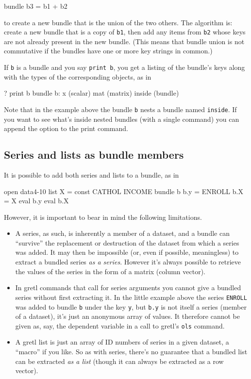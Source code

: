 \begin{code}
bundle b3 = b1 + b2
\end{code}

to create a new bundle that is the union of the two others. The
algorithm is: create a new bundle that is a copy of \texttt{b1}, then
add any items from \texttt{b2} whose keys are not already present in
the new bundle. (This means that bundle union is not commutative if
the bundles have one or more key strings in common.)

If \texttt{b} is a bundle and you say \texttt{print b}, you get a
listing of the bundle's keys along with the types of the corresponding
objects, as in

\begin{code}
? print b
bundle b:
 x (scalar)
 mat (matrix)
 inside (bundle)
\end{code}

Note that in the example above the bundle \texttt{b} nests a bundle
named \texttt{inside}. If you want to see what's inside nested bundles
(with a single command) you can append the  option to the
print command.

\subsection{Series and lists as bundle members}

It is possible to add both series and lists to a bundle, as in
\begin{code}
open data4-10
list X = const CATHOL INCOME
bundle b
b.y = ENROLL
b.X = X
eval b.y
eval b.X
\end{code}

However, it is important to bear in mind the following limitations.
\begin{itemize}
\item A series, as such, is inherently a member of a dataset, and a
  bundle can ``survive'' the replacement or destruction of the dataset
  from which a series was added. It may then be impossible (or, even
  if possible, meaningless) to extract a bundled series \textit{as a
    series}. However it's always possible to retrieve the values of
  the series in the form of a matrix (column vector).
\item In gretl commands that call for series arguments you cannot give
  a bundled series without first extracting it. In the little example
  above the series \texttt{ENROLL} was added to bundle \texttt{b}
  under the key \texttt{y}, but \texttt{b.y} is not itself a series
  (member of a dataset), it's just an anonymous array of values. It
  therefore cannot be given as, say, the dependent variable in a call
  to gretl's \texttt{ols} command.
\item A gretl list is just an array of ID numbers of series in a given
  dataset, a ``macro'' if you like. So as with series, there's no
  guarantee that a bundled list can be extracted \textit{as a list}
  (though it can always be extracted as a row vector).
\end{itemize}

